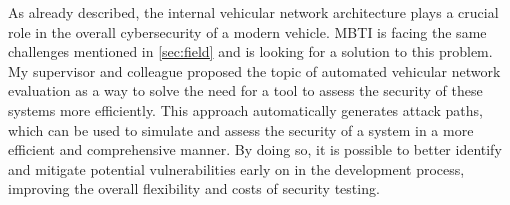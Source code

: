 As already described, the internal vehicular network architecture plays a crucial role in the overall cybersecurity of a modern vehicle. 
MBTI is facing the same challenges mentioned in \ref{sec:field} and is looking for a solution to this problem. 
My supervisor and colleague proposed the topic of automated vehicular network evaluation as a way to solve the need for a tool to assess the security of these systems more efficiently. 
This approach automatically generates attack paths, which can be used to simulate and assess the security of a system in a more efficient and comprehensive manner. 
By doing so, it is possible to better identify and mitigate potential vulnerabilities early on in the development process, improving the overall flexibility and costs of security testing.


